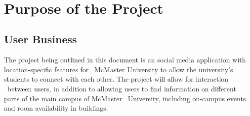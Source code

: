 \documentclass[12pt]{article}
\begin{document}
~\newpage
\section{Purpose of the Project}
\subsection{User Business}
\quad The project being outlined in this document is an social media application with location-specific features for \
McMaster University to allow the university's students to connect with each other. The project will allow for interaction \
between users, in addition to allowing users to find information on different parts of the main campus of McMaster \
University, including on-campus events and room availability in buildings.
\end{document}
